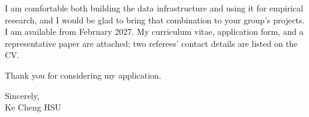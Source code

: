 \documentclass[11pt,letterpaper]{article}
\begin{document}
I am comfortable both building the data infrastructure and using it for empirical research, and I would be glad to bring that combination to your group's projects. I am available from February 2027. My curriculum vitae, application form, and a representative paper are attached; two referees' contact details are listed on the CV.

Thank you for considering my application.

Sincerely,\\
Ke Cheng HSU
\end{document}
